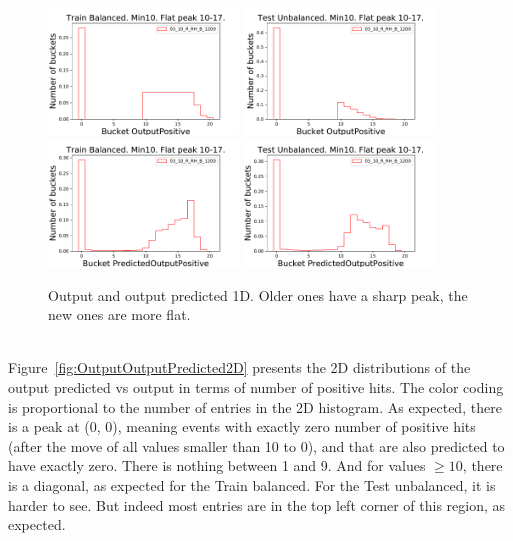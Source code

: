 \begin{figure}[t]
\centering
\includegraphics[width=0.45\textwidth]{plots/plot_02_1_overlay_histo_OutputPositive_Train.pdf}
\includegraphics[width=0.45\textwidth]{plots/plot_02_1_overlay_histo_OutputPositive_Test.pdf}\\
\includegraphics[width=0.45\textwidth]{plots/plot_02_1_overlay_histo_PredictedOutputPositive_Train.pdf}
\includegraphics[width=0.45\textwidth]{plots/plot_02_1_overlay_histo_PredictedOutputPositive_Test.pdf}\\
\caption{Output and output predicted 1D. Older ones have a sharp peak, the new ones are more flat.}
\label{fig:OutputOutputPredicted1D}
\end{figure}

\ \\Figure~\ref{fig:OutputOutputPredicted2D} presents the 2D distributions of the output predicted vs output in terms of number of positive hits. The color coding is proportional to the number of entries in the 2D histogram. As expected, there is a peak at (0, 0), meaning events with exactly zero number of positive hits (after the move of all values smaller than 10 to 0), and that are also predicted to have exactly zero. There is nothing between 1 and 9. And for values $\ge 10$, there is a diagonal, as expected for the Train balanced. For the Test unbalanced, it is harder to see. But indeed most entries are in the top left corner of this region, as expected.


